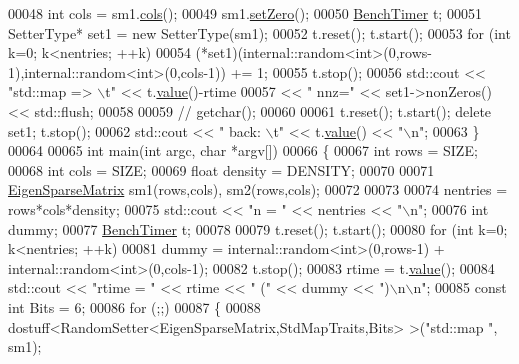 \begin{DoxyCode}
00048   \textcolor{keywordtype}{int} cols = sm1.\hyperlink{group___sparse_core___module_aa391750e3c530227e4a5c3c52e959975}{cols}();
00049   sm1.\hyperlink{group___sparse_core___module_ad3c7416090f913e8685523cb3ab7c2f7}{setZero}();
00050   \hyperlink{class_eigen_1_1_bench_timer}{BenchTimer} t;
00051   SetterType* set1 = \textcolor{keyword}{new} SetterType(sm1);
00052   t.reset(); t.start();
00053   \textcolor{keywordflow}{for} (\textcolor{keywordtype}{int} k=0; k<nentries; ++k)
00054     (*set1)(internal::random<int>(0,rows-1),internal::random<int>(0,cols-1)) += 1;
00055   t.stop();
00056   std::cout << \textcolor{stringliteral}{"std::map =>      \(\backslash\)t"} << t.\hyperlink{class_eigen_1_1_bench_timer_a26760f963ed8b64c126159bfea57735e}{value}()-rtime
00057             << \textcolor{stringliteral}{" nnz="} << set1->nonZeros() << std::flush;
00058 
00059   \textcolor{comment}{// getchar();}
00060 
00061   t.reset(); t.start(); \textcolor{keyword}{delete} set1; t.stop();
00062   std::cout << \textcolor{stringliteral}{"  back: \(\backslash\)t"} << t.\hyperlink{class_eigen_1_1_bench_timer_a26760f963ed8b64c126159bfea57735e}{value}() << \textcolor{stringliteral}{"\(\backslash\)n"};
00063 \}
00064     
00065 \textcolor{keywordtype}{int} main(\textcolor{keywordtype}{int} argc, \textcolor{keywordtype}{char} *argv[])
00066 \{
00067   \textcolor{keywordtype}{int} rows = SIZE;
00068   \textcolor{keywordtype}{int} cols = SIZE;
00069   \textcolor{keywordtype}{float} density = DENSITY;
00070 
00071   \hyperlink{group___sparse_core___module}{EigenSparseMatrix} sm1(rows,cols), sm2(rows,cols);
00072 
00073 
00074   nentries = rows*cols*density;
00075   std::cout << \textcolor{stringliteral}{"n = "} << nentries << \textcolor{stringliteral}{"\(\backslash\)n"};
00076   \textcolor{keywordtype}{int} dummy;
00077   \hyperlink{class_eigen_1_1_bench_timer}{BenchTimer} t;
00078 
00079   t.reset(); t.start();
00080   \textcolor{keywordflow}{for} (\textcolor{keywordtype}{int} k=0; k<nentries; ++k)
00081     dummy = internal::random<int>(0,rows-1) + internal::random<int>(0,cols-1);
00082   t.stop();
00083   rtime = t.\hyperlink{class_eigen_1_1_bench_timer_a26760f963ed8b64c126159bfea57735e}{value}();
00084   std::cout << \textcolor{stringliteral}{"rtime = "} << rtime << \textcolor{stringliteral}{" ("} << dummy << \textcolor{stringliteral}{")\(\backslash\)n\(\backslash\)n"};
00085   \textcolor{keyword}{const} \textcolor{keywordtype}{int} Bits = 6;
00086   \textcolor{keywordflow}{for} (;;)
00087   \{
00088     dostuff<RandomSetter<EigenSparseMatrix,StdMapTraits,Bits> >(\textcolor{stringliteral}{"std::map     "}, sm1);

\end{DoxyCode}
